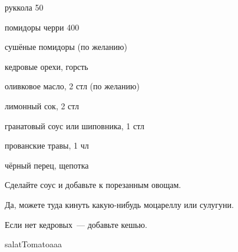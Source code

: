 {\label{arugula}
\item руккола 50
\item помидоры черри 400
\item сушёные помидоры (по желанию)
\item кедровые орехи, горсть
}{
\item оливковое масло, 2 стл (по желанию)
\item лимонный сок, 2 стл
\item гранатовый соус или шиповника, 1 стл
\item прованские травы, 1 чл
\item чёрный перец, щепотка
}{
Сделайте соус и добавьте к порезанным овощам.
}{
\begin{advice}
\item Да, можете туда кинуть какую-нибудь моцареллу или сулугуни.
\item Если нет кедровых~--- добавьте кешью.

\end{advice}}{salatTomato}{aaa}


